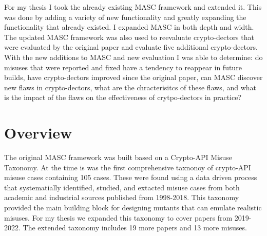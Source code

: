 For my thesis I took the already existing MASC framework and extended it. This was done by adding a variety of new functionality and greatly expanding the functionality that already existed. I expanded MASC in both depth and width. The updated MASC framework was also used to reevaluate crypto-dectors that were evaluated by the original paper and evaluate five additional crypto-dectors. With the new additions to MASC and new evaluation I was able to determine: do misuses that were reported and fixed have a tendency to reappear in future builds, have crypto-dectors improved since the original paper, can MASC discover new flaws in crypto-dectors, what are the chracterisitcs of these flaws, and what is the impact of the flaws on the effectiveness of crytpo-dectors in practice?



\section{Overview}
\label{ch1:sec:overview}


The original MASC framework was built based on a Crypto-API Misuse Taxonomy. At the time is was the first comprehensive taxnonoy of crypto-API misuse cases containing 105 cases. These were found using a data driven process that systematially identified, studied, and extacted misuse cases from both academic and industrial sources published from 1998-2018. This taxonomy provided the main building block for designing mutants that can emulate realistic misuses. For my thesis we expanded this taxonomy to cover papers from 2019-2022. The extended taxonomy includes 19 more papers and 13 more misuses.

